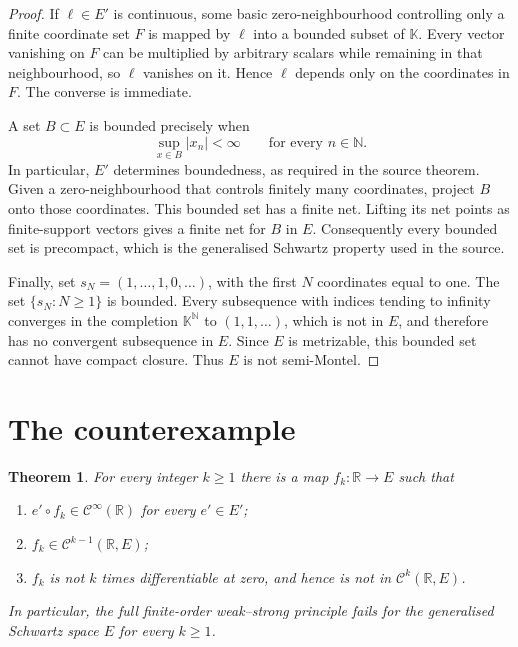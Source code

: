 \documentclass[10pt]{article}
\newtheorem{theorem}{Theorem}
\newcommand{\K}{\mathbb K}
\newcommand{\N}{\mathbb N}
\newcommand{\R}{\mathbb R}
\newcommand{\Ck}{\mathcal C}
\begin{document}
\begin{proof}
If $\ell\in E'$ is continuous, some basic zero-neighbourhood controlling only
a finite coordinate set $F$ is mapped by $\ell$ into a bounded subset of
$\K$. Every vector vanishing on $F$ can be multiplied by arbitrary scalars
while remaining in that neighbourhood, so $\ell$ vanishes on it. Hence
$\ell$ depends only on the coordinates in $F$. The converse is immediate.

A set $B\subset E$ is bounded precisely when
\[
 \sup_{x\in B}|x_n|<\infty\qquad\text{for every }n\in\N.
\]
In particular, $E'$ determines boundedness, as required in the source theorem.
Given a zero-neighbourhood that controls finitely many coordinates, project
$B$ onto those coordinates. This bounded set has a finite net. Lifting its
net points as
finite-support vectors gives a finite net for $B$ in $E$. Consequently every
bounded set is precompact, which is the generalised Schwartz property used in
the source.

Finally, set $s_N=(1,\ldots,1,0,\ldots)$, with the first $N$ coordinates equal
to one. The set $\{s_N:N\geq1\}$ is bounded. Every subsequence with indices
tending to infinity converges in the completion $\K^{\N}$ to
$(1,1,\ldots)$, which is not in $E$, and therefore has no convergent
subsequence in $E$. Since $E$ is metrizable, this bounded set cannot have
compact closure. Thus $E$ is not semi-Montel.
\end{proof}

\section{The counterexample}

\begin{theorem}\label{thm:counterexample}
For every integer $k\geq1$ there is a map $f_k:\R\to E$ such that
\begin{enumerate}[label=\textup{(\alph*)}]
\item $e'\circ f_k\in\Ck^\infty(\R)$ for every $e'\in E'$;
\item $f_k\in\Ck^{k-1}(\R,E)$;
\item $f_k$ is not $k$ times differentiable at zero, and hence is not in
      $\Ck^k(\R,E)$.
\end{enumerate}
In particular, the full finite-order weak--strong principle fails for the
generalised Schwartz space $E$ for every $k\geq1$.
\end{theorem}
\end{document}
